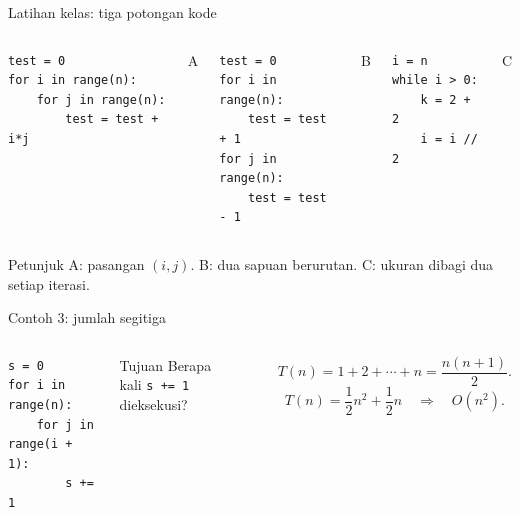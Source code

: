 \documentclass[aspectratio=169,11pt]{beamer}
\begin{document}
\begin{frame}[fragile]{Latihan kelas: tiga potongan kode}
\begin{columns}[T]
\begin{lstlisting}[basicstyle=\ttfamily\scriptsize]
test = 0
for i in range(n):
    for j in range(n):
        test = test + i*j
\end{lstlisting}
\centering A
\begin{lstlisting}[basicstyle=\ttfamily\scriptsize]
test = 0
for i in range(n):
    test = test + 1
for j in range(n):
    test = test - 1
\end{lstlisting}
\centering B
\begin{lstlisting}[basicstyle=\ttfamily\scriptsize]
i = n
while i > 0:
    k = 2 + 2
    i = i // 2
\end{lstlisting}
\centering C
\end{columns}
\vspace{2mm}
\pause
\begin{alertblock}{Petunjuk}
A: pasangan $(i,j)$. B: dua sapuan berurutan. C: ukuran dibagi dua setiap iterasi.
\end{alertblock}
\end{frame}

\begin{frame}[fragile]{Contoh 3: jumlah segitiga}
\begin{columns}[T]
\begin{lstlisting}
s = 0
for i in range(n):
    for j in range(i + 1):
        s += 1
\end{lstlisting}
\begin{block}{Tujuan}
Berapa kali \texttt{s += 1} dieksekusi?
\end{block}
\begin{center}
\end{center}
\pause
\[
T(n)=1+2+\cdots+n = \frac{n(n+1)}{2}.
\]
\pause
\[
T(n)=\frac{1}{2}n^2+\frac{1}{2}n \quad \Rightarrow \quad O(n^2).
\]
\end{columns}
\end{frame}
\end{document}
